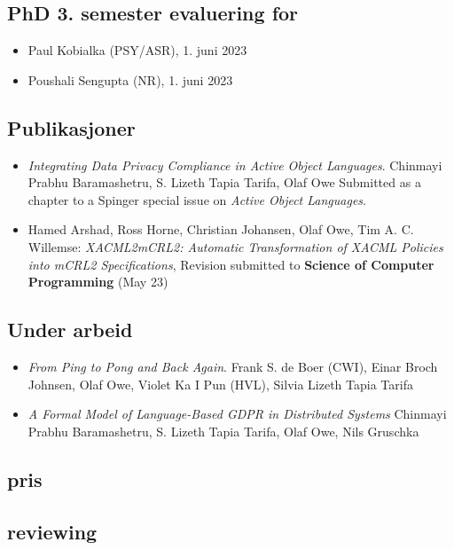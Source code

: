\documentclass[11pt]{article}
\begin{document}
\subsection{PhD 3. semester evaluering for}
\label{sec-1-3}

\begin{itemize}
\item Paul Kobialka (PSY/ASR), 1. juni 2023
\item Poushali Sengupta (NR), 1. juni 2023
\end{itemize}

\subsection{Publikasjoner}
\label{sec-1-4}
\begin{itemize}
\item \emph{Integrating Data Privacy Compliance in Active Object Languages}.
Chinmayi Prabhu Baramashetru, S. Lizeth Tapia Tarifa, Olaf Owe
Submitted as a chapter to a Spinger special issue on \emph{Active Object Languages}.

\item Hamed Arshad, Ross Horne, Christian Johansen, Olaf Owe, Tim
 A. C. Willemse: 
\emph{XACML2mCRL2: Automatic Transformation of XACML Policies into mCRL2 Specifications},
 Revision submitted to \textbf{Science of Computer  Programming} (May 23)
\end{itemize}

\subsection{Under arbeid}
\label{sec-1-5}

\begin{itemize}
\item \emph{From Ping to Pong and Back Again}.
Frank S. de Boer (CWI), Einar Broch Johnsen, Olaf Owe,
Violet Ka I Pun  (HVL),  Silvia Lizeth Tapia Tarifa

\item \emph{A Formal Model of Language-Based GDPR in Distributed Systems}
Chinmayi Prabhu Baramashetru, S. Lizeth Tapia Tarifa,
Olaf Owe,  Nils Gruschka
\end{itemize}

\subsection{pris}
\label{sec-1-6}

\subsection{reviewing}
\label{sec-1-7}
\end{document}
